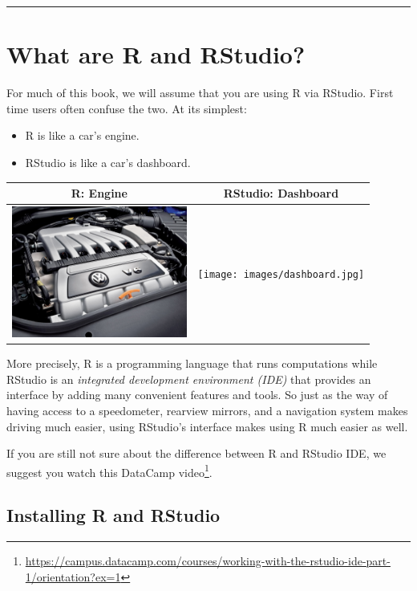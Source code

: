 \documentclass[12pt, krantz2,]{krantz}
\providecommand{\tightlist}{%
  \setlength{\itemsep}{0pt}\setlength{\parskip}{0pt}}
\renewcommand{\href}[2]{#2\footnote{\url{#1}}}
\begin{document}
\begin{center}\rule{0.5\linewidth}{\linethickness}\end{center}

\hypertarget{r-rstudio}{%
\section{What are R and RStudio?}\label{r-rstudio}}

For much of this book, we will assume that you are using R via RStudio. First time users often confuse the two. At its simplest:

\begin{itemize}
\tightlist
\item
  R is like a car's engine.
\item
  RStudio is like a car's dashboard.
\end{itemize}

\begin{longtable}[]{@{}cc@{}}
\toprule
R: Engine & RStudio: Dashboard\tabularnewline
\midrule
\endhead
\includegraphics[width=\textwidth,height=1.7in]{images/engine.jpg} & \texttt{[image: images/dashboard.jpg]}\tabularnewline
\bottomrule
\end{longtable}

More precisely, R is a programming language that runs computations while RStudio is an \emph{integrated development environment (IDE)} that provides an interface by adding many convenient features and tools. So just as the way of having access to a speedometer, rearview mirrors, and a navigation system makes driving much easier, using RStudio's interface makes using R much easier as well.

If you are still not sure about the difference between R and RStudio IDE, we suggest you watch this \href{https://campus.datacamp.com/courses/working-with-the-rstudio-ide-part-1/orientation?ex=1}{DataCamp video}.

\hypertarget{installing-r-and-rstudio}{%
\subsection{Installing R and RStudio}\label{installing-r-and-rstudio}}
\end{document}
